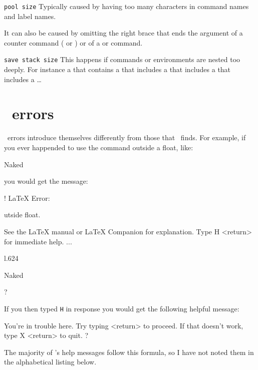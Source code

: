 \begin{plainlist}
\item[\texttt{pool size}\index{pool size}]
    Typically caused by having too many characters in command names
    and label names.

    It can also be caused by omitting the right brace that ends the
argument of a counter command (\cmd{\setcounter} or \cmd{\addtocounter})
or of a \cmd{\newenvironment} or \cmd{\newtheorem} command.

\item[\texttt{save stack size}\index{save stack size}]
   This happens if commands or environments are nested too deeply.
For instance a  that contains a  that includes
a \cmd{\multiput} that includes a  that includes a \ldots



\end{plainlist}



\section{\ltx\ errors}


    \ltx\ errors introduce themselves differently from those
that \tx\ finds. For example, if you ever happended to
use the \cmd{\caption} command outside a float, like:
\begin{lcode}
\caption{Naked}
\end{lcode}
you would get the message:
\begin{lcode}
! LaTeX Error: \caption outside float.

See the LaTeX manual or LaTeX Companion for explanation.
Type H <return> for immediate help.
 ...

l.624 \caption
              {Naked}
?
\end{lcode}
If you then typed \texttt{H} in response you would get the following
helpful message:
\begin{lcode}
You're in trouble here. Try typing <return> to proceed.
If that doesn't work, type X <return> to quit.
?
\end{lcode}
The majority of \ltx's help messages follow this formula, so I have
not noted them in the alphabetical listing below.



